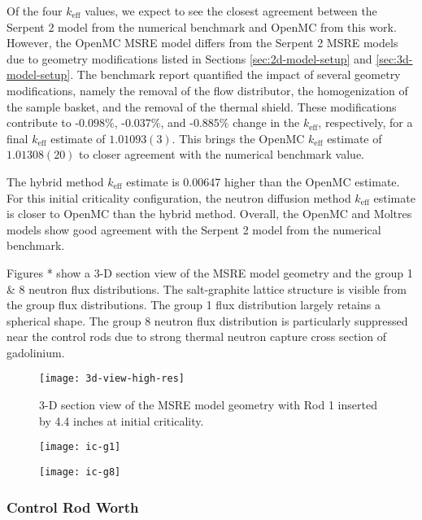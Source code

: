 Of the four $k_\text{eff}$ values, we expect to see the closest agreement between the Serpent 2
model from the numerical benchmark and OpenMC from this work. However, the OpenMC \gls{MSRE} model
differs from the Serpent 2 \gls{MSRE} models due to geometry modifications listed in Sections
\ref{sec:2d-model-setup} and \ref{sec:3d-model-setup}. The benchmark report quantified the impact
of several geometry modifications, namely the removal of the flow distributor, the homogenization
of the sample basket, and the removal of the thermal shield. These modifications contribute to
-$0.098\%$, -$0.037\%$, and -$0.885\%$ change in the $k_\text{eff}$, respectively, for a final
$k_\text{eff}$ estimate of $1.01093(3)$. This brings the OpenMC $k_\text{eff}$ estimate of
$1.01308(20)$ to closer agreement with the numerical benchmark value.

The hybrid method $k_\text{eff}$ estimate is 0.00647 higher than the OpenMC estimate. For this
initial criticality configuration, the neutron diffusion method $k_\text{eff}$ estimate is closer
to OpenMC than the hybrid method. Overall, the OpenMC and Moltres models show good agreement with
the Serpent 2 model from the numerical benchmark.

Figures * show a 3-D section view of the \gls{MSRE} model geometry and the group 1 \& 8 neutron
flux distributions. The salt-graphite lattice structure is visible from the group flux
distributions. The group 1 flux distribution largely retains a spherical shape. The group 8 neutron
flux distribution is particularly suppressed near the control rods due to strong thermal neutron
capture cross section of gadolinium.

\begin{figure}[p]
  \centering
  \texttt{[image: 3d-view-high-res]}
  \caption{3-D section view of the \gls{MSRE} model geometry with Rod 1 inserted by 4.4 inches at
  initial criticality.}
  \label{fig:3d-view}
\end{figure}

\begin{figure}[p]
  \centering
  \texttt{[image: ic-g1]}
  \caption{}
  \label{fig:ic-g1}
\end{figure}

\begin{figure}[p]
  \centering
  \texttt{[image: ic-g8]}
  \caption{}
  \label{fig:ic-g8}
\end{figure}

\subsubsection{Control Rod Worth}

